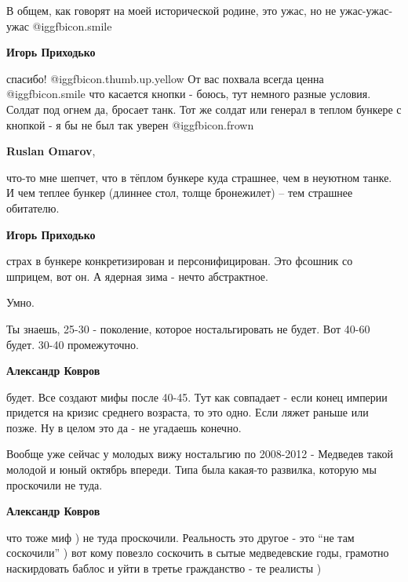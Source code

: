 \begin{itemize}
В общем, как говорят на моей исторической родине, это ужас, но не
ужас-ужас-ужас  @igg{fbicon.smile} 

\begin{itemize} %
\textbf{Игорь Приходько} 

спасибо! @igg{fbicon.thumb.up.yellow}  От вас похвала всегда ценна  @igg{fbicon.smile}  что касается кнопки - боюсь, тут
немного разные условия. Солдат под огнем да, бросает танк. Тот же солдат или
генерал в теплом бункере с кнопкой - я бы не был так уверен  @igg{fbicon.frown} 

\textbf{Ruslan Omarov}, 

что-то мне шепчет, что в тёплом бункере куда страшнее, чем в неуютном танке. И
чем теплее бункер (длиннее стол, толще бронежилет) -- тем страшнее обитателю.

\textbf{Игорь Приходько} 

страх в бункере конкретизирован и персонифицирован. Это фсошник со шприцем, вот
он. А ядерная зима - нечто абстрактное.
\end{itemize} %

Умно.


Ты знаешь, 25-30 - поколение, которое ностальгировать не будет. Вот 40-60
будет. 30-40 промежуточно.

\begin{itemize} %
\textbf{Александр Ковров} 

будет. Все создают мифы после 40-45. Тут как совпадает - если конец империи
придется на кризис среднего возраста, то это одно. Если ляжет раньше или позже.
Ну в целом это да - не угадаешь конечно.


Вообще уже сейчас у молодых вижу ностальгию по 2008-2012 - Медведев такой
молодой и юный октябрь впереди. Типа была какая-то развилка, которую мы
проскочили не туда.

\textbf{Александр Ковров} 

что тоже миф ) не туда проскочили. Реальность это другое - это \enquote{не там
соскочили} ) вот кому повезло соскочить в сытые медведевские годы, грамотно
наскирдовать баблос и уйти в третье гражданство - те реалисты )

\end{itemize} %



\end{itemize}
